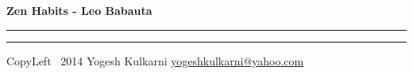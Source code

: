 

\usepackage{beamerarticle} %



\begin{center}
     \Large{\textbf{Zen Habits - Leo Babauta }}  %
\end{center}
\rule{\linewidth}{0.25pt}
\raggedright
\footnotesize
\begin{multicols}{3}




\rule{0.3\linewidth}{0.25pt}

\scriptsize
CopyLeft \textcopyleft\ 2014 Yogesh Kulkarni
\href{http://www.yogeshkulkarni.com}{yogeshkulkarni@yahoo.com}

\end{multicols}

